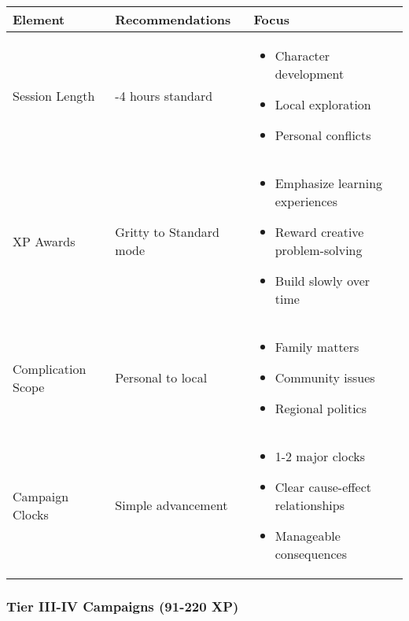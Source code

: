 \documentclass[11pt,letterpaper]{article}
\begin{document}
\begin{longtable}{|>{\raggedright\arraybackslash}p{3cm}|>{\raggedright\arraybackslash}p{4cm}|>{\raggedright\arraybackslash}p{5cm}|}
\hline
\textbf{Element} & \textbf{Recommendations} & \textbf{Focus} \\
\hline
Session Length & 3-4 hours standard & 
\begin{itemize}
    \item Character development
    \item Local exploration
    \item Personal conflicts
\end{itemize} \\
\hline
XP Awards & Gritty to Standard mode & 
\begin{itemize}
    \item Emphasize learning experiences
    \item Reward creative problem-solving
    \item Build slowly over time
\end{itemize} \\
\hline
Complication Scope & Personal to local & 
\begin{itemize}
    \item Family matters
    \item Community issues
    \item Regional politics
\end{itemize} \\
\hline
Campaign Clocks & Simple advancement & 
\begin{itemize}
    \item 1-2 major clocks
    \item Clear cause-effect relationships
    \item Manageable consequences
\end{itemize} \\
\hline
\end{longtable}

\subsubsection{Tier III-IV Campaigns (91-220 XP)}
\end{document}
